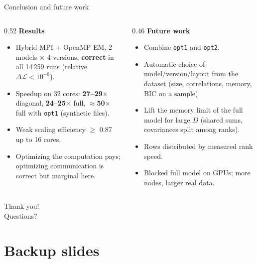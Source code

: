 \documentclass[aspectratio=169,10pt]{beamer}
\newcommand{\optone}{\texttt{opt1}}
\newcommand{\opttwo}{\texttt{opt2}}
\newif\ifbackup
\begin{document}
\begin{frame}{Conclusion and future work}
\begin{columns}[T]
\begin{column}{0.52\textwidth}
\small
\textbf{Results}
\begin{itemize}
\item Hybrid MPI + OpenMP EM, 2 models $\times$ 4 versions, \textbf{correct} in all 14\,259 runs (relative $\Delta\mathcal{L}<10^{-8}$).
\item Speedup on 32 cores: \textbf{27--29$\times$} diagonal, \textbf{24--25$\times$} full, \textbf{$\approx$50$\times$} full with \optone{} (synthetic files).
\item Weak scaling efficiency $\ge$ 0.87 up to 16 cores.
\item Optimizing the computation pays; optimizing communication is correct but marginal here.
\end{itemize}
\end{column}
\begin{column}{0.46\textwidth}
\small
\textbf{Future work}
\begin{itemize}
\item Combine \optone{} and \opttwo{}.
\item Automatic choice of model/version/layout from the dataset (size, correlations, memory, BIC on a sample).
\item Lift the memory limit of the full model for large $D$ (shared sums, covariances split among ranks).
\item Rows distributed by measured rank speed.
\item Blocked full model on GPUs; more nodes, larger real data.
\end{itemize}
\end{column}
\end{columns}
\end{frame}

\begin{frame}[standout]
Thank you!\\[1em]
\normalsize Questions?
\end{frame}

\appendix
\backuptrue
\section{Backup slides}
\end{document}
